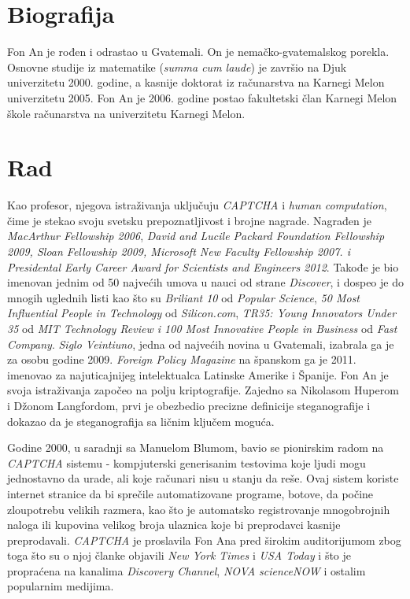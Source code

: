 \documentclass[titlepage, 12pt]{article}
\begin{document}
\section{Biografija}
Fon An je rođen i odrastao u Gvatemali. On je nemačko-gvatemalskog porekla. 
Osnovne studije iz matematike (\textit{summa cum laude}) je završio na Djuk univerzitetu 2000. godine, a kasnije doktorat iz računarstva na Karnegi Melon univerzitetu 2005.
Fon An je 2006. godine postao fakultetski član Karnegi Melon škole računarstva na univerzitetu Karnegi Melon.

\section{Rad}
Kao profesor, njegova istraživanja uključuju \textit{CAPTCHA} i \textit{human computation}, čime je stekao svoju svetsku prepoznatljivost i brojne nagrade. Nagrađen je \textit{MacArthur Fellowship 2006}, \textit{David and Lucile Packard Foundation Fellowship 2009, Sloan Fellowship 2009, Microsoft New Faculty Fellowship 2007. i Presidental Early Career Award for Scientists and Engineers 2012}. Takođe je bio imenovan jednim od 50 najvećih umova u nauci od strane \textit{Discover}, i dospeo je do mnogih uglednih listi kao što su \textit{Briliant 10} od \textit{Popular Science}, \textit{50 Most Influential People in Technology} od \textit{Silicon.com}, \textit{TR35: Young Innovators Under 35} od \textit{MIT Technology Review i 100 Most Innovative People in Business} od \textit{Fast Company}. 
\textit{Siglo Veintiuno}, jedna od najvećih novina u Gvatemali, izabrala ga je za osobu godine 2009. \textit{Foreign Policy Magazine} na španskom ga je 2011. imenovao za najuticajnijeg intelektualca Latinske Amerike i Španije. 
Fon An je svoja istraživanja započeo na polju kriptografije. Zajedno sa Nikolasom Huperom i Džonom Langfordom, prvi je obezbedio precizne definicije steganografije i dokazao da je steganografija sa ličnim ključem moguća.

Godine 2000, u saradnji sa Manuelom Blumom, bavio se pionirskim radom na \textit{CAPTCHA} sistemu - kompjuterski generisanim testovima koje ljudi mogu jednostavno da urade, ali koje računari nisu u stanju da reše. Ovaj sistem koriste internet stranice da bi sprečile automatizovane programe, botove, da počine zloupotrebu velikih razmera, kao što je automatsko registrovanje mnogobrojnih naloga ili kupovina velikog broja ulaznica koje bi preprodavci kasnije preprodavali. \textit{CAPTCHA} je proslavila Fon Ana pred širokim auditorijumom zbog toga što su o njoj članke objavili \textit{New York Times} i \textit{USA Today} i što je propraćena na kanalima \textit{Discovery Channel}, \textit{NOVA scienceNOW} i ostalim popularnim medijima.
\end{document}
